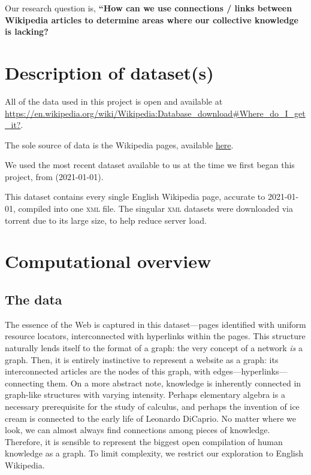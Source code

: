 \documentclass[fontsize=12pt]{article}
\begin{document}
\begin{multicols}{2}
    Our research question is, \textbf{``How can we use connections / links between Wikipedia articles to determine areas where our collective knowledge is lacking?}

    \section{Description of dataset(s)}

    All of the data used in this project is open and available at \href{https://en.wikipedia.org/wiki/Wikipedia:Database\_download\#Where\_do\_I\_get\_it?}{https://en.wikipedia.org/wiki/Wikipedia:Database\_download\#Where\_do\_I\_get\_it?}. \parencite{WikimediaDownloads}

    The sole source of data is the Wikipedia pages, available \href{https://meta.wikimedia.org/wiki/Data\_dump\_torrents\#English\_Wikipedia}{here}. \parencite{DataDumpTorrents}

    We used the most recent dataset available to us at the time we first began this project, from (2021-01-01).

    This dataset contains every single English Wikipedia page, accurate to 2021-01-01, compiled into one \textsc{xml} file.
    The singular \textsc{xml} datasets were downloaded via torrent due to its large size, to help reduce server load.

    \section{Computational overview}

    \subsection{The data}
    The essence of the Web is captured in this dataset---pages identified with uniform resource locators, interconnected with hyperlinks within the pages.
    This structure naturally lends itself to the format of a graph: the very concept of a network \emph{is} a graph.
    Then, it is entirely instinctive to represent a website as a graph: its interconnected articles are the nodes of this graph, with edges---hyperlinks---connecting them.
    On a more abstract note, knowledge is inherently connected in graph-like structures with varying intensity.
    Perhaps elementary algebra is a necessary prerequisite for the study of calculus, and perhaps the invention of ice cream is connected to the early life of Leonardo DiCaprio.
    No matter where we look, we can almost always find connections among pieces of knowledge.
    Therefore, it is sensible to represent the biggest open compilation of human knowledge as a graph.
    To limit complexity, we restrict our exploration to English Wikipedia.


\end{multicols}
\end{document}
